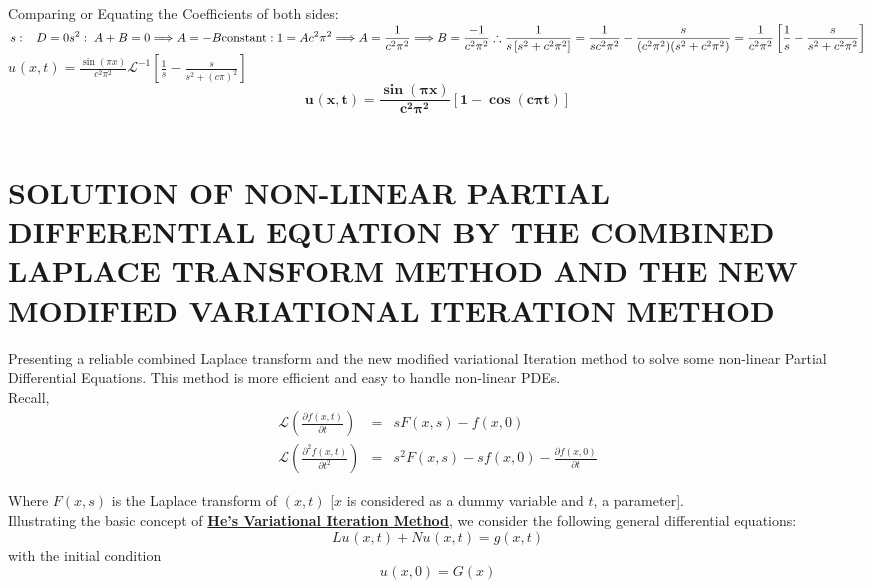 \documentclass[12pt]{report}
\newcommand{\Laplace}{\mathcal{L}}
\newcommand{\sbracket}[1]{\left[#1\right]}
\newcommand{\Un}[2]{u_{#1}(#2)}
\newcommand{\NI}{\noindent}
\newcommand{\psq}{\pi^{2}}
\newcommand{\InverseL}[1]{\Laplace^{-1}\left[#1\right]}
\newcommand{\LTb}[1]{\Laplace \left(#1\right)}
\begin{document}
\NI Comparing or Equating the Coefficients of both sides: \\[0.2cm]
$ \displaystyle
s: \; \; \; D = 0 \\
s^2: \; A + B = 0 \Longrightarrow A = - B  \\
\text{constant}: 1 = A c^2 \psq \Longrightarrow A = \frac{1}{c^2 \psq} \Longrightarrow B = \frac{-1}{c^2 \psq}\\[0.3cm]
\therefore \frac{1}{s\sbracket{s^2 + c^2 \psq}} = \frac{1}{s c^2 \psq} - \frac{s}{(c^2 \psq)(s^2 + c^2 \psq)} = \frac{1}{c^2 \psq} \sbracket{\frac{1}{s} - \frac{s}{s^2 + c^2 \psq}}
$\\[0.2cm]

$ \displaystyle
\Un{}{x,t} = \frac{\sin(\pi x)}{c^2 \psq} \InverseL{\frac{1}{s} - \frac{s}{s^2 + (c\pi)^2}}
$\\[0.2cm]

$$ \displaystyle \mathbf{
\Un{}{x,t} = \frac{\sin(\pi x)}{c^2 \psq}\sbracket{1 - \cos(c\pi t)}
}$$\\[0.2cm]

\section{SOLUTION OF NON-LINEAR PARTIAL DIFFERENTIAL EQUATION BY THE COMBINED LAPLACE TRANSFORM METHOD AND THE NEW MODIFIED VARIATIONAL ITERATION METHOD}
\NI Presenting a reliable combined Laplace transform and the new modified variational Iteration method to solve some non-linear Partial Differential Equations. This method is more efficient and easy to handle non-linear PDEs.\\

\NI Recall, \\[0.2cm]
\begin{eqnarray}
	\LTb{\frac{\partial f(x,t)}{\partial t}} &=& sF(x,s) - f(x,0)\\
	\LTb{\frac{\partial^2 f(x,t)}{\partial t^2}} &=& s^2 F(x,s) - sf(x,0) - \frac{\partial f(x,0)}{\partial t}
\end{eqnarray}

\NI Where $F(x,s)$ is the Laplace transform of $(x,t)$ [$x$ is considered as a dummy variable and $t$, a parameter].\\[0.2cm]

\NI Illustrating the basic concept of \underline{\textbf{He's Variational Iteration Method}}, we consider the following general differential equations:\\
\begin{equation}
	L\Un{}{x,t} + N\Un{}{x,t} = g(x,t) \label{eq:4_14}
\end{equation}
with the initial condition 
\begin{equation}
	\Un{}{x,0} = G(x) \label{eq:4_15} 
\end{equation}
\end{document}

